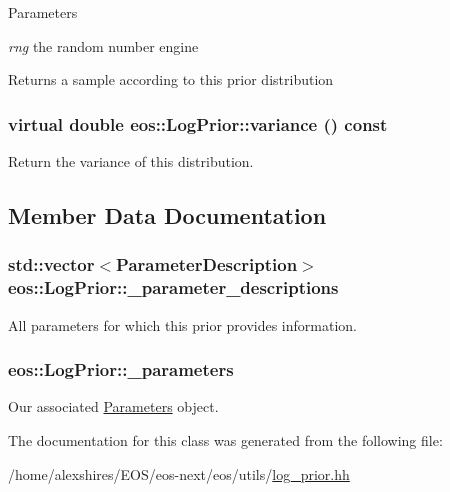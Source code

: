 \begin{DoxyParams}{Parameters}
\item[{\em rng}]the random number engine \end{DoxyParams}
\begin{DoxyReturn}{Returns}
a sample according to this prior distribution 
\end{DoxyReturn}
\hypertarget{classeos_1_1LogPrior_a525c7cd21ac2f4f273893d8740ca9136}{
\subsubsection[{variance}]{\setlength{\rightskip}{0pt plus 5cm}virtual double eos::LogPrior::variance () const}}
\label{classeos_1_1LogPrior_a525c7cd21ac2f4f273893d8740ca9136}
Return the variance of this distribution. 

\subsection{Member Data Documentation}
\hypertarget{classeos_1_1LogPrior_a2b9c6a50c9f4399e44973bad25b390be}{
\subsubsection[{\_\-parameter\_\-descriptions}]{\setlength{\rightskip}{0pt plus 5cm}std::vector$<${\bf ParameterDescription}$>$ {\bf eos::LogPrior::\_\-parameter\_\-descriptions}}}
\label{classeos_1_1LogPrior_a2b9c6a50c9f4399e44973bad25b390be}


All parameters for which this prior provides information. \hypertarget{classeos_1_1LogPrior_a5b24d36e7d7d2f77d5a7d6533233f93b}{
\subsubsection[{\_\-parameters}]{ {\bf eos::LogPrior::\_\-parameters}}}
\label{classeos_1_1LogPrior_a5b24d36e7d7d2f77d5a7d6533233f93b}


Our associated \hyperlink{classeos_1_1Parameters}{Parameters} object. 

The documentation for this class was generated from the following file:\begin{DoxyCompactItemize}
\item 
/home/alexshires/EOS/eos-\/next/eos/utils/\hyperlink{log__prior_8hh}{log\_\-prior.hh}\end{DoxyCompactItemize}
